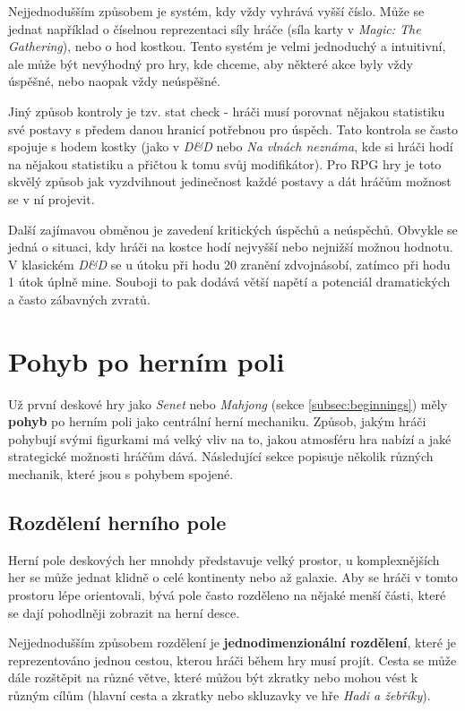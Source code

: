 Nejjednodušším způsobem je systém, kdy vždy vyhrává vyšší číslo. Může se jednat například o číselnou reprezentaci síly hráče (síla karty v \textit{Magic: The Gathering}), nebo o hod kostkou. Tento systém je velmi jednoduchý a intuitivní, ale může být nevýhodný pro hry, kde chceme, aby některé akce byly vždy úspěšné, nebo naopak vždy neúspěšné.

Jiný způsob kontroly je tzv. stat check - hráči musí porovnat nějakou statistiku své postavy s předem danou hranicí potřebnou pro úspěch. Tato kontrola se často spojuje s hodem kostky (jako v \textit{D\&D} nebo \textit{Na vlnách neznáma}, kde si hráči hodí na nějakou statistiku a přičtou k tomu svůj modifikátor). Pro RPG hry je toto skvělý způsob jak vyzdvihnout jedinečnost každé postavy a dát hráčům možnost se v ní projevit.

Další zajímavou obměnou je zavedení kritických úspěchů a neúspěchů. Obvykle se jedná o situaci, kdy hráči na kostce hodí nejvyšší nebo nejnižší možnou hodnotu. V klasickém \textit{D\&D} se u útoku při hodu 20 zranění zdvojnásobí, zatímco při hodu 1 útok úplně mine. Souboji to pak dodává větší napětí a potenciál dramatických a často zábavných zvratů.



\section{Pohyb po herním poli}
\label{sec:movement}

Už první deskové hry jako \textit{Senet} nebo \textit{Mahjong} (sekce \ref{subsec:beginnings}) měly \textbf{pohyb} po herním poli jako centrální herní mechaniku. Způsob, jakým hráči pohybují svými figurkami má velký vliv na to, jakou atmosféru hra nabízí a jaké strategické možnosti hráčům dává. Následující sekce popisuje několik různých mechanik, které jsou s pohybem spojené.

\subsection{Rozdělení herního pole}
\label{subsec:tessellation}

Herní pole deskových her mnohdy představuje velký prostor, u komplexnějších her se může jednat klidně o celé kontinenty nebo až galaxie. Aby se hráči v tomto prostoru lépe orientovali, bývá pole často rozděleno na nějaké menší části, které se dají pohodlněji zobrazit na herní desce.

Nejjednodušším způsobem rozdělení je \textbf{jednodimenzionální rozdělení}, které je reprezentováno jednou cestou, kterou hráči během hry musí projít. Cesta se může dále rozštěpit na různé větve, které můžou být zkratky nebo mohou vést k různým cílům (hlavní cesta a zkratky nebo skluzavky ve hře \textit{Hadi a žebříky}).

